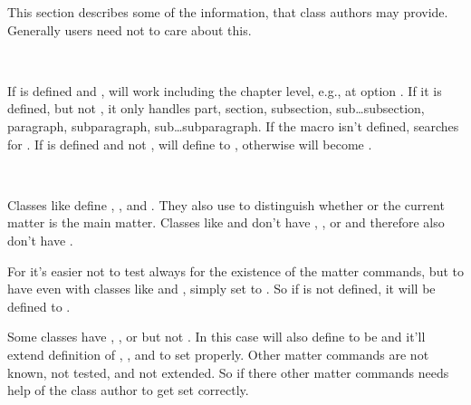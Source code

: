 This section describes some of the information, that class authors may
provide. Generally users need not to care about this.

\begin{Declaration}
  \  \ 
\end{Declaration}
%
If  is defined and ,  will
work including the chapter level, e.g., at option . If it is
defined, but not , it only handles part, section, subsection,
sub\dots subsection, paragraph, subparagraph, sub\dots subparagraph. If the
macro isn't defined,  searches for . If
 is defined and not ,  will
define  to , otherwise  will
become .%

\begin{Declaration}
  \  \ 
\end{Declaration}
%
Classes like  define , , and
. They also use  to distinguish whether
or the current matter is the main matter. Classes like  and
 don't have , , or
 and therefore also don't have .

For  it's easier not to test always for the existence of the
matter commands, but to have  even with classes like
 and , simply set to . So if
 is not defined, it will be defined to .

Some classes have , , or
 but not . In this case
 will also define  to be 
and it'll extend definition of , , and
 to set  properly. Other matter
commands are not known, not tested, and not extended. So if there other matter
commands  needs help of the class author to get
 set correctly.%

